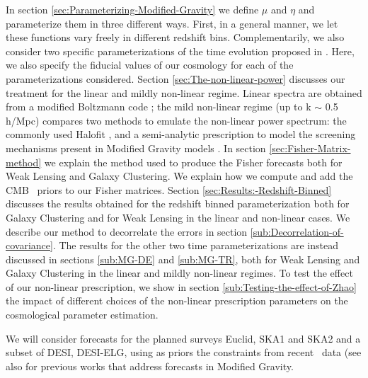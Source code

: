 In section \ref{sec:Parameterizing-Modified-Gravity} we define $\mu$ and $\eta$ and parameterize them in three different ways. First, in a general manner, we let these functions vary freely in different  redshift bins. Complementarily, we also consider two specific parameterizations of the time evolution proposed in \cite{planck_collaboration_planck_2016}. Here, we also specify the fiducial values of our cosmology for each of the
parameterizations considered.
Section \ref{sec:The-non-linear-power} discusses our treatment for the linear and mildly non-linear regime. Linear spectra are obtained from a modified Boltzmann
code \cite{hojjati_testing_2011}; the mild non-linear regime (up to k $\sim$ 0.5 h/Mpc) compares two methods to emulate the non-linear power spectrum: the commonly used Halofit \cite{smith_stable_2003, takahashi_revising_2012}, and a semi-analytic prescription to model
the screening mechanisms present in Modified Gravity models \cite{hu_parameterized_2007}.
In section \ref{sec:Fisher-Matrix-method} we explain the method used
to produce the Fisher forecasts both for Weak Lensing and Galaxy
Clustering. We explain how we compute and add the CMB \planck\ priors to our Fisher matrices.
Section \ref{sec:Results:-Redshift-Binned} discusses the results
obtained for the redshift binned parameterization both for Galaxy Clustering
and for Weak Lensing in the linear and non-linear cases. We describe our method to decorrelate the errors in section
\ref{sub:Decorrelation-of-covariance}. The results for the other two time parameterizations are instead discussed in sections \ref{sub:MG-DE} and \ref{sub:MG-TR}, both for Weak Lensing and Galaxy Clustering in the linear and mildly non-linear
regimes. To test the effect of our non-linear prescription, we show in section \ref{sub:Testing-the-effect-of-Zhao} the impact of different choices of the non-linear prescription parameters on the cosmological parameter estimation.




 We will consider forecasts for the planned surveys Euclid, SKA1 and SKA2 and a subset of DESI, DESI-ELG, using as priors the
constraints from recent \planck\ data (see also \cite{Alonso2016, hojjati_cosmological_2012, baker_observational_2015, bull_extending_2015, Gleyzes2016} for previous works that address forecasts in Modified Gravity.

